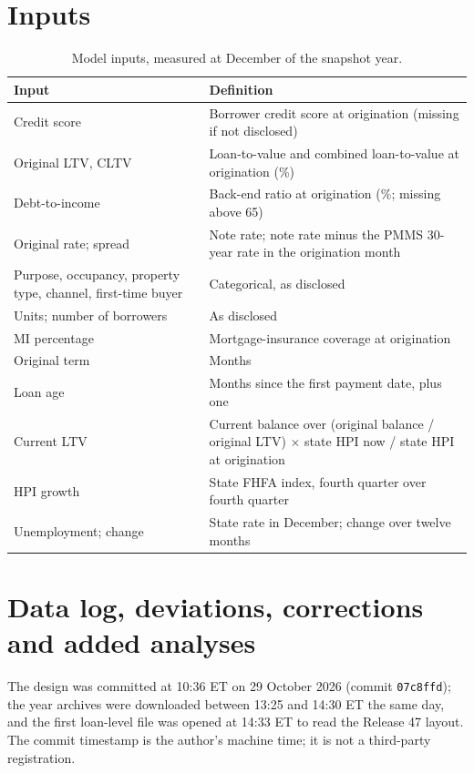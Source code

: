 \section{Inputs}\label{app:features}

\begin{table}[H]\centering\small
\caption{Model inputs, measured at December of the snapshot year.}\label{tab:features}
\begin{tabularx}{\linewidth}{>{\raggedright\arraybackslash}p{5.2cm}X}\toprule
Input & Definition \\ \midrule
Credit score & Borrower credit score at origination (missing if not disclosed) \\
Original LTV, CLTV & Loan-to-value and combined loan-to-value at origination (\%) \\
Debt-to-income & Back-end ratio at origination (\%; missing above 65) \\
Original rate; spread & Note rate; note rate minus the PMMS 30-year rate in the origination month \\
Purpose, occupancy, property type, channel, first-time buyer & Categorical, as disclosed \\
Units; number of borrowers & As disclosed \\
MI percentage & Mortgage-insurance coverage at origination \\
Original term & Months \\
Loan age & Months since the first payment date, plus one \\
Current LTV & Current balance over (original balance / original LTV) $\times$ state HPI now / state HPI at origination \\
HPI growth & State FHFA index, fourth quarter over fourth quarter \\
Unemployment; change & State rate in December; change over twelve months \\
\bottomrule
\end{tabularx}
\end{table}

\section{Data log, deviations, corrections and added analyses}\label{app:deviations}

The design was committed at 10:36 ET on 29 October 2026 (commit
\texttt{07c8ffd}); the year archives were downloaded between 13:25 and 14:30
ET the same day, and the first loan-level file was opened at 14:33 ET to read
the Release 47 layout. The commit timestamp is the author's machine time; it
is not a third-party registration.

